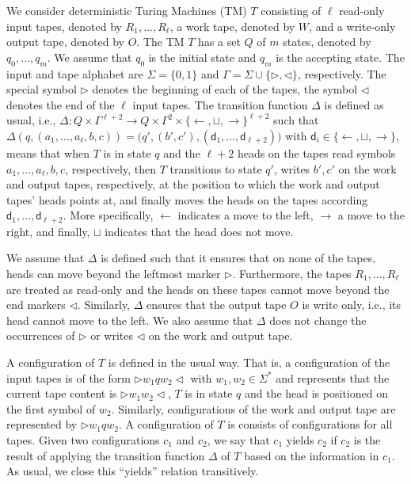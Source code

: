 We consider  deterministic Turing Machines  (TM) $T$ consisting of $\ell$ read-only input tapes, denoted by $R_1,\ldots,R_\ell$,
a work tape, denoted by $W$, and a write-only output tape, denoted by $O$. The TM $T$ has a set $Q$ of $m$
states, denoted by $q_0,\ldots,q_m$. We assume that $q_0$ is the initial state and $q_m$ is the accepting state.
The input and tape alphabet are $\Sigma=\{0,1\}$ and $\Gamma=\Sigma\cup\{\rhd,\lhd\}$, respectively. The special symbol $\rhd$ denotes the beginning of each of the tapes, the symbol $\lhd$ denotes the end of the $\ell$ input tapes. The transition function $\Delta$ is defined as usual, i.e., 
$\Delta:Q\times \Gamma^{\ell+2} \to Q\times \Gamma^{2}\times \{\leftarrow,\sqcup,\rightarrow\}^{\ell+2}$ such that $\Delta(q,(a_1,\ldots,a_{\ell},b,c))=\bigl(q',(b',c'),(\mathsf{d}_1,\ldots,\mathsf{d}_{\ell+2})\bigr)$ with $\mathsf{d}_i\in \{\leftarrow,\sqcup,\rightarrow\}$, means that when $T$ is in state $q$ and the $\ell+2$ heads on the tapes read symbols $a_1,\ldots,a_{\ell},b,c$, respectively, then $T$ transitions to state $q'$, writes $b',c'$ on the work and output tapes, respectively, at the position to which the work and output tapes' heads points at, and finally moves the heads on the tapes according $\mathsf{d}_1,\ldots,\mathsf{d}_{\ell+2}$. More specifically, $\leftarrow$  indicates a move to the left, 
$\rightarrow$ a move to the right, and finally, $\sqcup$ indicates that the head does not move.

We assume that $\Delta$ is defined such that it ensures that on none of the tapes, heads can move beyond the leftmost marker $\rhd$. Furthermore, the tapes $R_1,\ldots,R_\ell$ are treated as read-only and the heads on these tapes cannot move beyond the end markers $\lhd$. Similarly, $\Delta$ ensures that the output tape $O$ is write only, i.e., its head cannot move to the left.  We also assume that $\Delta$ does not change the occurrences of $\rhd$ or writes $\lhd$ on the work and output tape.

A configuration of $T$ is defined in the usual way. That is, a configuration of the input tapes is of the form
$\rhd w_1qw_2\lhd$ with $w_1,w_2\in\Sigma^*$ and represents that the current tape content is $\rhd w_1w_2\lhd$, $T$ is in state $q$ and the head is positioned on the first symbol of $w_2$. Similarly, configurations of the work and output tape are represented by $\rhd w_1qw_2$. A configuration of $T$ is consists of configurations for all tapes. Given two configurations $c_1$ and $c_2$, we say that $c_1$ yields $c_2$ if $c_2$ is the result of applying the transition function $\Delta$ of $T$ based on the information in $c_1$. As usual, we close this ``yields'' relation transitively.

